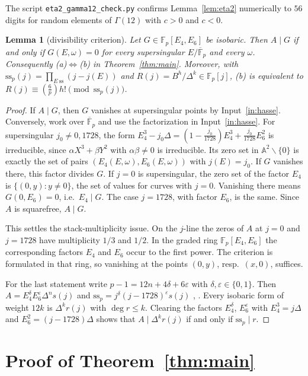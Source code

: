 \documentclass[11pt,a4paper]{article}
\numberwithin{equation}{section}
\newtheorem{lemma}[theorem]{Lemma}
\theoremstyle{definition}
\theoremstyle{remark}
\newcommand{\Fp}{\mathbb F_p}
\newcommand{\Fb}{\overline{\mathbb F}_p}
\newcommand{\Lp}[1]{\left(\frac{#1}{p}\right)}
\begin{document}
The script \texttt{eta2\_gamma12\_check.py} confirms Lemma~\ref{lem:eta2} numerically to
$56$ digits for random elements of $\Gamma(12)$ with $c>0$ and $c<0$.

\begin{lemma}[divisibility criterion]\label{lem:div}
Let $G\in\Fp[E_4,E_6]$ be isobaric. Then $A\mid G$ if and only if $G(E,\omega)=0$ for every
supersingular $E/\Fb$ and every $\omega$. Consequently (a)$\Leftrightarrow$(b) in
Theorem~\ref{thm:main}. Moreover, with $\mathrm{ss}_p(j)=\prod_{E\ \mathrm{ss}}(j-j(E))$ and
$R(j)=B^h/\Delta^k\in\Fp[j]$, (b) is equivalent to
$R(j)\equiv\Lp6h!\pmod{\mathrm{ss}_p(j)}$.
\end{lemma}

\begin{proof}
If $A\mid G$, then $G$ vanishes at supersingular points by Input~\ref{in:hasse}.
Conversely, work over $\Fb$ and use the factorization in Input~\ref{in:hasse}. For
supersingular $j_0\ne0,1728$, the form $E_4^3-j_0\Delta=(1-\frac{j_0}{1728})E_4^3+\frac{j_0}{1728}E_6^2$
is irreducible, since $\alpha X^3+\beta Y^2$ with $\alpha\beta\ne0$ is irreducible. Its zero
set in $\mathbb A^2\smallsetminus\{0\}$ is exactly the set of pairs
$(E_4(E,\omega),E_6(E,\omega))$ with $j(E)=j_0$. If $G$ vanishes there, this factor divides
$G$. If $j=0$ is supersingular, the zero set of the factor $E_4$ is $\{(0,y):y\ne0\}$, the
set of values for curves with $j=0$. Vanishing there means $G(0,E_6)=0$, i.e.\ $E_4\mid G$.
The case $j=1728$, with factor $E_6$, is the same. Since $A$ is squarefree, $A\mid G$.

This settles the stack-multiplicity issue. On the $j$-line the zeros of $A$ at $j=0$ and
$j=1728$ have multiplicity $1/3$ and $1/2$. In the graded ring $\Fp[E_4,E_6]$ the
corresponding factors $E_4$ and $E_6$ occur to the first power. The criterion is formulated
in that ring, so vanishing at the points $(0,y)$, resp.\ $(x,0)$, suffices.

For the last statement write $p-1=12n+4\delta+6\varepsilon$ with $\delta,\varepsilon\in\{0,1\}$.
Then $A=E_4^\delta E_6^\varepsilon\Delta^n s(j)$ and
$\mathrm{ss}_p=j^\delta(j-1728)^\varepsilon s(j)$ \cite[\S3]{KZ98}, \cite[\S6]{Baker98}.
Every isobaric form of weight $12k$ is $\Delta^kr(j)$ with $\deg r\le k$. Clearing the
factors $E_4^\delta$, $E_6^\varepsilon$ with $E_4^3=j\Delta$ and $E_6^2=(j-1728)\Delta$ shows
that $A\mid\Delta^k r(j)$ if and only if $\mathrm{ss}_p\mid r$.
\end{proof}

\section{Proof of Theorem~\ref{thm:main}}\label{sec:proof}
\end{document}
